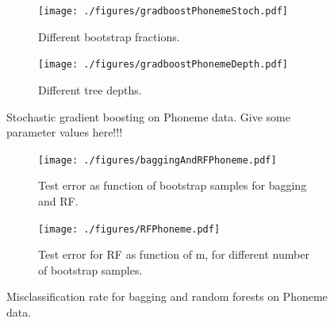 \begin{figure}[h!]
  \centering
  \begin{subfigure}[b]{0.48\textwidth}
    \texttt{[image: ./figures/gradboostPhonemeStoch.pdf]}
    \caption{Different bootstrap fractions.}
    \label{fig:gradboostPhonemeStoch}
  \end{subfigure}%
  \quad
  \begin{subfigure}[b]{0.48\textwidth}
    \texttt{[image: ./figures/gradboostPhonemeDepth.pdf]}
    \caption{Different tree depths.}
    \label{fig:gradboostPhonemeDepth}
  \end{subfigure}
  \vspace{1\baselineskip}
  \caption{Stochastic gradient boosting on Phoneme data. Give some parameter values here!!!}
  \label{fig:StochasticGradBoostPhoneme}
\end{figure}

\begin{figure}[h!]
  \centering
  \begin{subfigure}[b]{0.48\textwidth}
    \texttt{[image: ./figures/baggingAndRFPhoneme.pdf]}
    \caption{Test error as function of bootstrap samples for bagging and RF.}
    \label{fig:baggingAndRFPhoneme}
  \end{subfigure}%
  \quad
  \begin{subfigure}[b]{0.48\textwidth}
    \texttt{[image: ./figures/RFPhoneme.pdf]}
    \caption{Test error for RF as function of m, for different number of bootstrap samples.}
    \label{fig:RFPhoneme}
  \end{subfigure}
  \vspace{1\baselineskip}
  \caption{Misclassification rate for bagging and random forests on Phoneme data.}
  \label{fig:baggAndRFPhoneme}
\end{figure}

